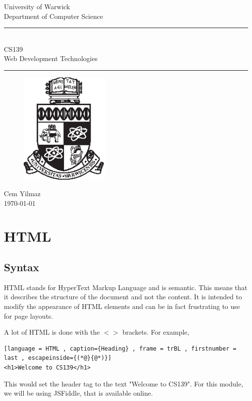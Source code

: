 \documentclass[a4paper]{article}
\theoremstyle{plain}
\theoremstyle{definition}
\theoremstyle{remark}
\begin{document}
	\begin{titlepage}
	\begin{center}
	\large
	University of Warwick \\
	Department of Computer Science \\
	\huge
	\vspace{50mm}
	\rule{\linewidth}{0.5pt} \\
	CS139 \\
	\vspace{5mm}
	\Large
	Web Development Technologies
	\rule{\linewidth}{0.5pt}
	\vspace{5mm}
	\begin{figure}[H]
	\centering
	\includegraphics[width=0.4\textwidth]{crest.eps}
	\end{figure}
	\vspace{37mm}
	Cem Yilmaz \\
	\today
	\end{center}
	\end{titlepage}
	\newpage
	\tableofcontents
	\newpage
\section{HTML}
\subsection{Syntax}
HTML stands for HyperText Markup Language and is semantic. This means that it describes the structure of the document and not the content. It is intended to modify the appearance of HTML elements and can be in fact frustrating to use for page layouts.

A lot of HTML is done with the $<>$ brackets. For example,
\begin{lstlisting}[language = HTML , caption={Heading} , frame = trBL , firstnumber = last , escapeinside={(*@}{@*)}]
<h1>Welcome to CS139</h1>
\end{lstlisting}
This would set the header tag to the text "Welcome to CS139". For this module, we will be using JSFiddle, that is available online.
\end{document}
